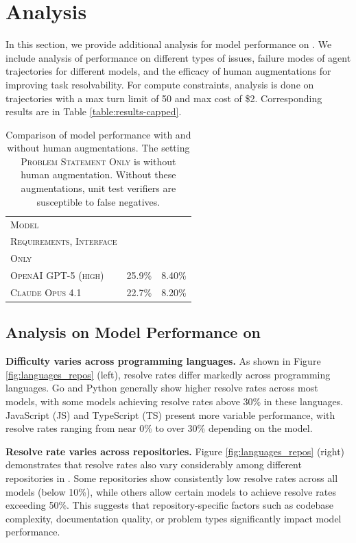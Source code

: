 \section{Analysis}

In this section, we provide additional analysis for model performance on \benchmarkname. We include analysis of performance on different types of issues, failure modes of agent trajectories for different models, and the efficacy of human augmentations for improving task resolvability. For compute constraints, analysis is done on trajectories with a max turn limit of 50 and max cost of \$2. Corresponding results are in Table \ref{table:results-capped}.

\begin{table}[t]
\centering
\begin{tabular}{@{}l c c@{}}
\toprule
\textsc{Model} & \makecell{\textsc{Problem Statement,} \\ \textsc{Requirements, Interface}} & \makecell{\textsc{Problem Statement} \\ \textsc{Only}} \\
\midrule
\textsc{OpenAI GPT-5 (high)} & 25.9\% & 8.40\% \\
\textsc{Claude Opus 4.1} & 22.7\% & 8.20\% \\
\bottomrule
\end{tabular}
\caption{Comparison of model performance with and without human augmentations. The setting \textsc{Problem Statement Only} is without human augmentation. Without these augmentations, unit test verifiers are susceptible to false negatives.}
\label{table:comparison_results}
\end{table}

\subsection{Analysis on Model Performance on \benchmarkname}

\textbf{Difficulty varies across programming languages.} As shown in Figure \ref{fig:languages_repos} (left), resolve rates differ markedly across programming languages. Go and Python generally show higher resolve rates across most models, with some models achieving resolve rates above 30\% in these languages. JavaScript (JS) and TypeScript (TS) present more variable performance, with resolve rates ranging from near 0\% to over 30\% depending on the model.

\textbf{Resolve rate varies across repositories.} Figure \ref{fig:languages_repos} (right) demonstrates that resolve rates also vary considerably among different repositories in \benchmarkname. Some repositories show consistently low resolve rates across all models (below 10\%), while others allow certain models to achieve resolve rates exceeding 50\%. This suggests that repository-specific factors such as codebase complexity, documentation quality, or problem types significantly impact model performance.

